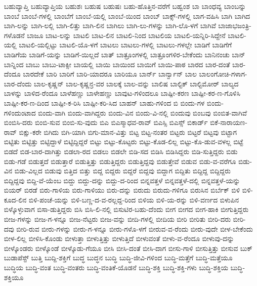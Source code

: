 {ಬಹುವ್ಯಾಪ್ತಿ
ಬಹುವ್ಯಾಪ್ತಿಯ
ಬಹುಶಃ
ಬಹುಷ
ಬಹುಷಃ
ಬಹು-ಹೊತ್ತಿನ-ವರೆಗೆ
ಬಹ್ವಂಶ
ಬಾ
ಬಾಂಧವ್ಯ
ಬಾಂಬನ್ನು
ಬಾಂಬೆ
ಬಾಂಬೆ-ಗಳಲ್ಲಿ
ಬಾಂಬೆಗೆ
ಬಾಂಬೆ-ಯಲ್ಲಿ
ಬಾಂಬೆ-ಯಿಂದ
ಬಾಂಬ್
ಬಾಕ್ಸ್-ಗಳಲ್ಲಿ
ಬಾಗ-ವಹಿಸಿ
ಬಾಗಿ
ಬಾಗಿದ
ಬಾಗಿ-ಲನ್ನು
ಬಾಗಿ-ಲಲ್ಲಿ
ಬಾಗಿ-ಲಿತ್ತು
ಬಾಗಿ-ಲಿನ
ಬಾಗಿಲು
ಬಾಗಿ-ಲು-ಗಳನ್ನು
ಬಾಗಿ-ಲೊ-ಳಗೆ
ಬಾಗಿವೆ
ಬಾಜಾಭಜಂತ್ರಿ-ಗಳೊಡನೆ
ಬಾಜೂ
ಬಾಟ-ಲನ್ನು
ಬಾಟಲಿ
ಬಾಟ-ಲಿನ
ಬಾಟಲಿ-ನಿಂದ
ಬಾಟಲಿಯ
ಬಾಟಲಿ-ಯನ್ನಿರಿ-ಸಿದ್ದೇನೆ
ಬಾಟಲಿ-ಯಲ್ಲಿ
ಬಾಟಲಿ-ಯಲ್ಲಿಟ್ಟು
ಬಾಟಲಿ-ಯೊ-ಳಗೆ
ಬಾಟಲು
ಬಾಟಲು-ಗಳಲ್ಲಿ
ಬಾಟಲು-ಗಳಲ್ಲೇ
ಬಾಡಿಗೆ
ಬಾಡಿಗೆಗೆ
ಬಾಡಿಗೆಯ
ಬಾಡಿಗೆ-ಯನ್ನು
ಬಾಡಿಗೆ-ಯಿಲ್ಲದೆ
ಬಾತ್
ಬಾತ್ರೂಂಗಳಲ್ಲಿ
ಬಾತ್ರೂಂಗಳಿರ-ಬೇಕೆಂದು
ಬಾನಿನಂಚು
ಬಾನ್
ಬಾನ್ನಿಂದ
ಬಾಬು
ಬಾಬು-ಟಾಕ್ಸೀ
ಬಾಯಲ್ಲಿ
ಬಾಯಿ
ಬಾಯಿಂದ
ಬಾಯಿಗೆ
ಬಾಯಿ-ಪಾಠ
ಬಾರದ
ಬಾರ-ದಂತೆ
ಬಾರ-ದೆಂದೂ
ಬಾರದೇಕೆ
ಬಾರಿ
ಬಾರಿಗೆ
ಬಾರಿ-ಯಾದರೂ
ಬಾರಿಯೂ
ಬಾರ್ನ್
ಬಾರ್ನ್ವಾನ್
ಬಾಲ
ಬಾಲಂಗೋಚಿ-ಗಳಾಗ-ಬಾರ-ದೆಂದು
ಬಾಲ-ಕೃಷ್ಣನ್
ಬಾಲ-ಕೃಷ್ಣನ್ರ-ವರ
ಬಾಲಕ್ಕೆ
ಬಾಲ-ವನ್ನು
ಬಾಲಿಷ
ಬಾಲ್ಟಿಕ್
ಬಾಲ್ಟಿಮೋರ್
ಬಾಲ್ಯದ
ಬಾಳನ್ನು
ಬಾಳಿದ-ರೆಂದೂ
ಬಾಳೆಹಣ್ಣು
ಬಾಳೇಹಣ್ಣು
ಬಾವುಟ-ಗಳಿಂದಲೂ
ಬಾಷ್ಪೀ-ಕರಣ
ಬಾಷ್ಪೀ-ಕರ-ಣ-ಗೊಳಿಸಿ
ಬಾಷ್ಪೀ-ಕರ-ಣ-ದಿಂದ
ಬಾಷ್ಪೀ-ಕ-ರಿಸಿ
ಬಾಷ್ಪೀ-ಕರಿ-ಸಿದ
ಬಾಹನ್
ಬಾಹು-ಗಳಿಂದ
ಬಿ
ಬಿಂದು-ಗಳ
ಬಿಂದು-ಗಳಿಂದುಂಟಾದ
ಬಿಂದು-ವಾಗಿ
ಬಿಂದು-ವಾಗಿದ್ದರು
ಬಿಂದು-ವಿನ
ಬಿಂದು-ವಿ-ನಲ್ಲಿ
ಬಿಂದುವು
ಬಿಂಬವು
ಬಿಂಬಿತ-ವಾಗಿವೆ
ಬಿಂಬಿಸಿ-ದರು
ಬಿಂಬಿ-ಸುವ
ಬಿಂಬಿ-ಸು-ವುದು
ಬಿಎ
ಬಿಎಸ್ಮಾಧವ-ರಾವ್
ಬಿಎಸ್ಸಿ
ಬಿಎಸ್ಸ್
ಬಿಕಾರ್ಡ್
ಬಿಕೆ-ನಾರಾಯಣ-ರಾವ್
ಬಿಕ್ಷು-ಕರೇ
ಬಿಗಿದು
ಬಿಗಿ-ಯಾಗಿ
ಬಿಗು-ಮಾನ-ವಿತ್ತು
ಬಿಟ್ಟ
ಬಿಟ್ಟ-ನಂತರ
ಬಿಟ್ಟರು
ಬಿಟ್ಟರೆ
ಬಿಟ್ಟವು
ಬಿಟ್ಟಾಗ
ಬಿಟ್ಟಿತು
ಬಿಟ್ಟಿತ್ತು
ಬಿಟ್ಟಿದ್ದಾಳೆ
ಬಿಟ್ಟಿದ್ದಿದ್ದರೆ
ಬಿಟ್ಟು
ಬಿಟ್ಟು-ಕೊಟ್ಟರು
ಬಿಟ್ಟು-ಕೊಡ-ಲಿಲ್ಲ
ಬಿಟ್ಟು-ಕೊ-ಡುವ-ವಳಲ್ಲ
ಬಿಟ್ಟೆ
ಬಿಡದೆ
ಬಿಡ-ಬಾರ-ದಾಗಿತ್ತು
ಬಿಡಲಾ-ರದ
ಬಿಡಲು
ಬಿಡಲೇ
ಬಿಡಿ-ಸದ
ಬಿಡಿಸಿ
ಬಿಡಿಸಿದ್ದರು
ಬಿಡಿ-ಸುತ್ತಿದ್ದರು
ಬಿಡು
ಬಿಡು-ಗಡೆ
ಬಿಡುತ್ತದೆ
ಬಿಡುತ್ತಾರೆ
ಬಿಡುತ್ತಿತ್ತು
ಬಿಡುತ್ತಿದ್ದರು
ಬಿಡುತ್ತಿದ್ದವು
ಬಿಡುತ್ತೇವೆ
ಬಿಡುವ
ಬಿಡು-ವ-ವರೆಗೂ
ಬಿಡು-ವಿನ
ಬಿಡು-ವಿಲ್ಲದ
ಬಿಡುವು
ಬಿತ್ತಿದ
ಬಿತ್ತು
ಬಿದ್ದ
ಬಿದ್ದರು
ಬಿದ್ದರೆ
ಬಿದ್ದವು
ಬಿದ್ದಾಗ
ಬಿದ್ದಿತು
ಬಿದ್ದಿದ್ದ
ಬಿದ್ದಿದ್ದರು
ಬಿದ್ದಿದ್ದವು
ಬಿದ್ದಿ-ವೆ-ಯೆಂಬ
ಬಿದ್ದು
ಬಿದ್ದು-ದನ್ನು
ಬಿದ್ದು-ದ-ರಿಂದ
ಬಿನ್ನವತ್ತಳೆ
ಬಿನ್ನವತ್ತಳೆ-ದಲ್ಲಿ
ಬಿನ್ನವತ್ತಳೆ-ಯನ್ನು
ಬಿಯರ್
ಬಿರಡೆ
ಬಿರು-ಗಾಳಿಯ
ಬಿರು-ಗಾಳಿಯು
ಬಿರು-ದನ್ನು
ಬಿರುದು
ಬಿರುದು-ಗಳಿಗೂ
ಬಿರುಸಿನ
ಬಿರ್ಬೆಕ್
ಬಿಳಿ
ಬಿಳಿ-ಕೂದ-ಲಿನ
ಬಿಳಿ-ಪಂಚೆ-ಯನ್ನು
ಬಿಳಿ-ಬಣ್ಣ-ದ-ವ-ರಲ್ಲದ್ದ-ರಿಂದ
ಬಿಳಿಯ
ಬಿಳಿ-ಯ-ರನ್ನು
ಬಿಳಿ-ವರ್ಣದ
ಬಿಳುಪಿನ
ಬಿಳ್ಕೊಳ್ಳುವಾಗ
ಬಿಸಾ-ಡುತ್ತಿದ್ದರು
ಬಿಸಿ
ಬಿಸಿ-ಲಿ-ನಲ್ಲಿ
ಬಿಸುಟಿರ-ಬಹು-ದೆಂದು
ಬೀಗ
ಬೀಗದ
ಬೀಗ-ಹಾಕಿ
ಬೀಗುತ್ತಿದ್ದರು
ಬೀಜ-ಗಳನ್ನು
ಬೀಜ-ಗ-ಳನ್ನೂ
ಬೀಜ-ನೆಟ್ಟರು
ಬೀಜ-ವನ್ನು
ಬೀದಿ-ಗಳಲ್ಲಿ
ಬೀದಿಯ
ಬೀರಿ
ಬೀರಿತು
ಬೀರಿ-ದರು
ಬೀರಿ-ದವು
ಬೀರಿ-ರುವ
ಬೀರು-ಗಳನ್ನು
ಬೀರು-ಗ-ಳನ್ನೂ
ಬೀರು-ಗಳೊ-ಳಗೆ
ಬೀರುವ-ವ-ರೆಂದು
ಬೀರು-ವುದೇ
ಬೀಳ-ಬೇಕೆಂದು
ಬೀಳ-ಲಿಲ್ಲ
ಬೀಳಿಸಿ-ಕೊಂಡು
ಬೀಳುತ್ತಾ
ಬೀಳುತ್ತಿತ್ತು
ಬೀಳುತ್ತಿದೆ
ಬೀಳುವಂತೆ
ಬೀಳು-ವ-ರೆಂದೂ
ಬೀಳುವು-ದನ್ನು
ಬೀಳ್ಕೊಂಡರು
ಬೀಳ್ಕೊಂಡೆ
ಬೀಳ್ಕೊಡು-ಗೆಯೂ
ಬೀಸಿ
ಬೀಸಿ-ದಂತೆ
ಬೀಸಿ-ದಾಗ
ಬೀಸು-ಗಾಳಿ
ಬೀಸುತ್ತಿತ್ತು
ಬೀಸುವ
ಬುಕ್
ಬುಡಾಪೆಸ್ಟ್
ಬುತ್ತಿ
ಬುದ್ದಿ-ಶಕ್ತಿಗೆ
ಬುದ್ಧ
ಬುದ್ಧನ
ಬುದ್ಧಿ
ಬುದ್ಧಿ-ಜೀವಿ-ಗಳಿಂದ
ಬುದ್ಧಿ-ಮತ್ತೆಗೆ
ಬುದ್ಧಿ-ಮತ್ತೆಯೂ
ಬುದ್ಧಿಯ
ಬುದ್ಧಿ-ವಂತ
ಬುದ್ಧಿ-ವಂತರು
ಬುದ್ಧಿ-ವಂತಿಕೆ-ಯೊಡನೆ
ಬುದ್ಧಿ-ಶಕ್ತಿ
ಬುದ್ಧಿ-ಶಕ್ತಿ-ಗಳು
ಬುದ್ಧಿ-ಶಕ್ತಿಯ
ಬುದ್ಧಿ-ಶಕ್ತಿಯೂ
}
